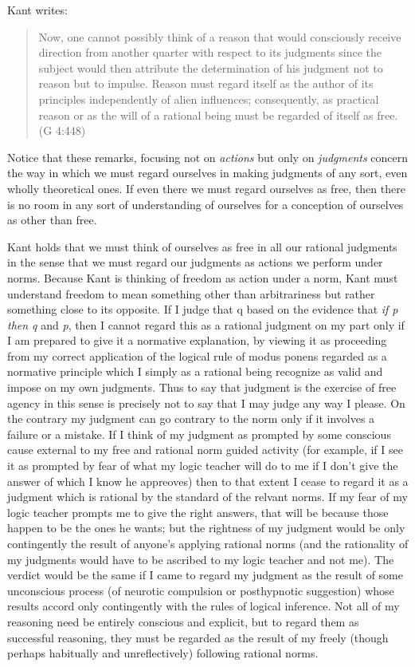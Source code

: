 Kant writes:
\begin{quote}
    Now, one cannot possibly think of a reason that would consciously receive direction from another quarter with respect to its judgments since the subject would then attribute the determination of his judgment not to reason but to impulse. Reason must regard itself as the author of its principles independently of alien influences; consequently, as practical reason or as the will of a rational being must be regarded of itself as free. (G 4:448)
\end{quote}
Notice that these remarks, focusing not on \emph{actions} but only on \emph{judgments} concern the way in which we must regard ourselves in making judgments of any sort, even wholly theoretical ones. If even there we must regard ourselves as free, then there is no room in any sort of understanding of ourselves for a conception of ourselves as other than free.

Kant holds that we must think of ourselves as free in all our rational judgments in the sense that we must regard our judgments as actions we perform under norms. Because Kant is thinking of freedom as action under a norm, Kant must understand freedom to mean something other than arbitrariness but rather something close to its opposite. If I judge that q based on the evidence that \emph{if p then q} and \emph{p}, then I cannot regard this as a rational judgment on my part only if I am prepared to give it a normative explanation, by viewing it as proceeding from my correct application of the logical rule of modus ponens regarded as a normative principle which I simply as a rational being recognize as valid and impose on my own judgments. Thus to say that judgment is the exercise of free agency in this sense is precisely not to say that I may judge any way I please. On the contrary my judgment can go contrary to the norm only if it involves a failure or a mistake. If I think of my judgment as prompted by some conscious cause external to my free and rational norm guided activity (for example, if I see it as prompted by fear of what my logic teacher will do to me if I don’t give the answer of which I know he appreoves) then to that extent I cease to regard it as a judgment which is rational by the standard of the relvant norms. If my fear of my logic teacher prompts me to give the right answers, that will be because those happen to be the ones he wants; but the rightness of my judgment would be only contingently the result of anyone’s applying rational norms (and the rationality of my judgments would have to be ascribed to my logic teacher and not me). The verdict would be the same if I came to regard my judgment as the result of some unconscious process (of neurotic compulsion or posthypnotic suggestion) whose results accord only contingently with the rules of logical inference. Not all of my reasoning need be entirely conscious and explicit, but to regard them as successful reasoning, they must be regarded as the result of my freely (though perhaps habitually and unreflectively) following rational norms.


